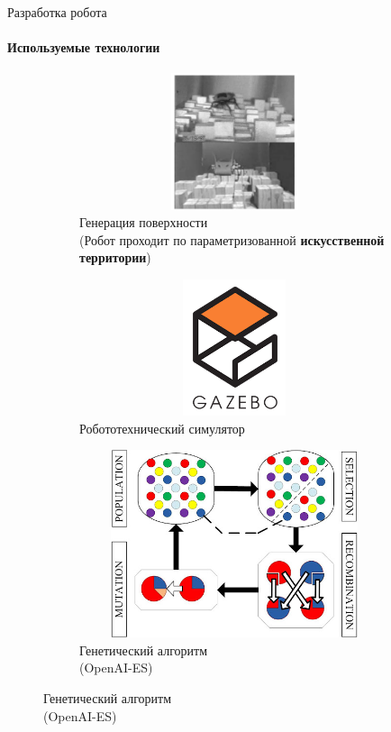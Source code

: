 \documentclass[aspectratio=169,xcolor=table]{beamer}
\begin{document}
\begin{frame}[c]{Разработка робота}
    \framesubtitle{Используемые технологии}
    \vspace{-0.9cm}
    \begin{figure}[H]
        \begin{subfigure}[t]{0.32\textwidth}
            \centering\includegraphics[height=4cm,width=1\textwidth,keepaspectratio]{c1_paper.png}
            \caption*{\small Генерация поверхности \\ (Робот проходит по параметризованной \textbf{искусственной территории})}
        \end{subfigure}
        \hfill
        \begin{subfigure}[t]{0.32\textwidth}
            \centering\includegraphics[height=4cm,width=1\textwidth,keepaspectratio]{gazebo_logo.png}
            \caption*{Робототехнический симулятор}
        \end{subfigure}
        \hfill
        \begin{subfigure}[t]{0.32\textwidth}
            \centering\includegraphics[height=5.5cm,width=1\textwidth,keepaspectratio]{gen_algo.jpg}
            \caption*{Генетический алгоритм \\ (OpenAI-ES)}
        \end{subfigure}
        \hfill
    \end{figure}
\end{frame}
\end{document}
